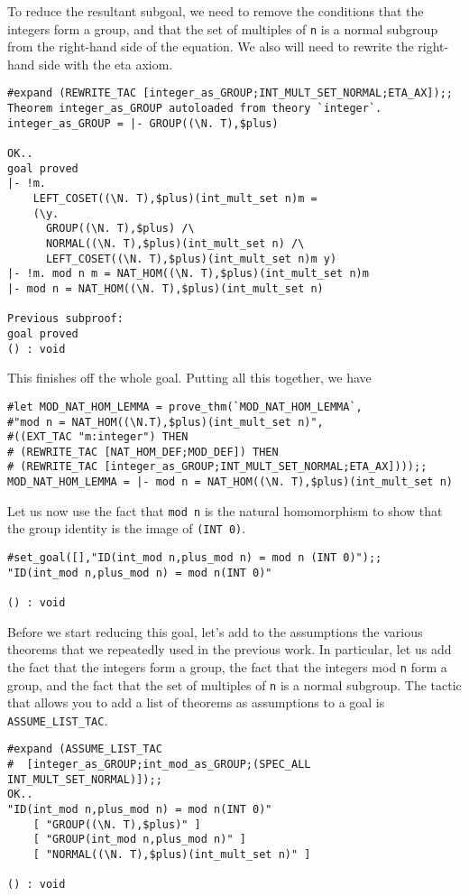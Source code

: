 To reduce the resultant subgoal, we need to remove the conditions
that the integers form a group, and that the set of  multiples of
{\small\tt n} is a normal subgroup from the right-hand side of the
equation.  We also will need to rewrite the right-hand side with the
eta axiom.
\begin{session}
\begin{verbatim}
#expand (REWRITE_TAC [integer_as_GROUP;INT_MULT_SET_NORMAL;ETA_AX]);;
Theorem integer_as_GROUP autoloaded from theory `integer`.
integer_as_GROUP = |- GROUP((\N. T),$plus)

OK..
goal proved
|- !m.
    LEFT_COSET((\N. T),$plus)(int_mult_set n)m =
    (\y.
      GROUP((\N. T),$plus) /\
      NORMAL((\N. T),$plus)(int_mult_set n) /\
      LEFT_COSET((\N. T),$plus)(int_mult_set n)m y)
|- !m. mod n m = NAT_HOM((\N. T),$plus)(int_mult_set n)m
|- mod n = NAT_HOM((\N. T),$plus)(int_mult_set n)

Previous subproof:
goal proved
() : void
\end{verbatim}
\end{session}

This finishes off the whole goal.  Putting all this together, we have
\begin{session}
\begin{verbatim}
#let MOD_NAT_HOM_LEMMA = prove_thm(`MOD_NAT_HOM_LEMMA`,
#"mod n = NAT_HOM((\N.T),$plus)(int_mult_set n)",
#((EXT_TAC "m:integer") THEN
# (REWRITE_TAC [NAT_HOM_DEF;MOD_DEF]) THEN
# (REWRITE_TAC [integer_as_GROUP;INT_MULT_SET_NORMAL;ETA_AX])));;
MOD_NAT_HOM_LEMMA = |- mod n = NAT_HOM((\N. T),$plus)(int_mult_set n)
\end{verbatim}
\end{session}

Let us now use the fact that {\small\verb+mod n+} is the natural
homomorphism to show that the group identity is the image of
{\small\verb+(INT 0)+}.
\begin{session}
\begin{verbatim}
#set_goal([],"ID(int_mod n,plus_mod n) = mod n (INT 0)");;
"ID(int_mod n,plus_mod n) = mod n(INT 0)"

() : void
\end{verbatim}
\end{session}

Before we start reducing this goal, let's add to the assumptions the
various theorems that we repeatedly used in the previous work.  In
particular, let us add the fact that the integers form a group, the
fact that the integers mod {\small\tt n} form a group, and the fact
that the set of multiples of {\small\tt n} is a normal subgroup.  The
tactic that allows you to add a list of theorems as assumptions to a
goal is {\small\verb+ASSUME_LIST_TAC+}.
\begin{session}
\begin{verbatim}
#expand (ASSUME_LIST_TAC
#  [integer_as_GROUP;int_mod_as_GROUP;(SPEC_ALL INT_MULT_SET_NORMAL)]);;
OK..
"ID(int_mod n,plus_mod n) = mod n(INT 0)"
    [ "GROUP((\N. T),$plus)" ]
    [ "GROUP(int_mod n,plus_mod n)" ]
    [ "NORMAL((\N. T),$plus)(int_mult_set n)" ]

() : void
\end{verbatim}
\end{session}

